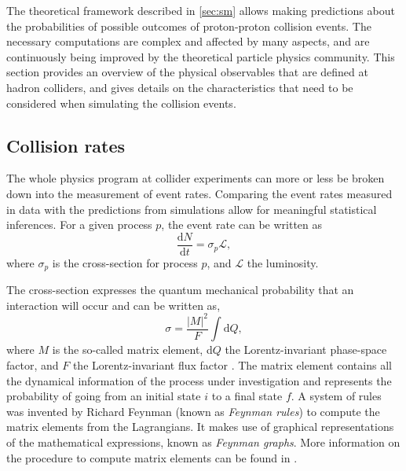 
The theoretical framework described in \cref{sec:sm} allows making predictions about the probabilities of possible outcomes of proton-proton collision events. 
The necessary computations are complex and affected by many aspects, and are continuously being improved by the theoretical particle physics community.
This section provides an overview of the physical observables that are defined at hadron colliders, and gives details on the characteristics that need to be considered when simulating the collision events. 


\subsection{Collision rates}
The whole physics program at collider experiments can more or less be broken down into the measurement of event rates. Comparing the event rates measured in data with the predictions from simulations allow for meaningful statistical inferences.
For a given process $p$, the event rate can be written as
\begin{equation}
  \frac{\mathrm{d}N}{\mathrm{d}t} = \sigma_p \mathcal{L},
\end{equation}
where $\sigma_p$ is the cross-section for process $p$, and $\mathcal{L}$ the luminosity.

The cross-section expresses the quantum mechanical probability that an interaction will occur and can be written as,
\begin{equation}
  \sigma = \frac{|M|^2}{F} \int \text{d}Q,
\end{equation}
where $M$ is the so-called matrix element, d$Q$ the Lorentz-invariant phase-space factor, and $F$ the Lorentz-invariant flux factor \cite{Halzen:1984mc}. 
The matrix element contains all the dynamical information of the process under investigation and represents the probability of going from an initial state $i$ to a final state $f$. 
A system of rules was invented by Richard Feynman (known as \emph{Feynman rules}) to compute the matrix elements from the Lagrangians. It makes use of graphical representations of the mathematical expressions, known as \emph{Feynman graphs}. More information on the procedure to compute matrix elements can be found in .

